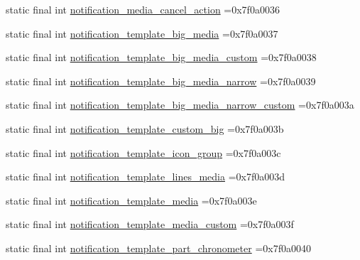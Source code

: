 \begin{DoxyCompactItemize}
static final int \mbox{\hyperlink{classcom_1_1example_1_1trainawearapplication_1_1_r_1_1layout_a07fd51d46bb2925c0b18e29171167ad3}{notification\+\_\+media\+\_\+cancel\+\_\+action}} =0x7f0a0036
\item 
static final int \mbox{\hyperlink{classcom_1_1example_1_1trainawearapplication_1_1_r_1_1layout_a52a08ef57d8c2095df10d45d4f8092e3}{notification\+\_\+template\+\_\+big\+\_\+media}} =0x7f0a0037
\item 
static final int \mbox{\hyperlink{classcom_1_1example_1_1trainawearapplication_1_1_r_1_1layout_a4ee801fe05669fdc4c228750079f0e53}{notification\+\_\+template\+\_\+big\+\_\+media\+\_\+custom}} =0x7f0a0038
\item 
static final int \mbox{\hyperlink{classcom_1_1example_1_1trainawearapplication_1_1_r_1_1layout_a88be24ae4da9b4f0ba63d8b37dfbd1a2}{notification\+\_\+template\+\_\+big\+\_\+media\+\_\+narrow}} =0x7f0a0039
\item 
static final int \mbox{\hyperlink{classcom_1_1example_1_1trainawearapplication_1_1_r_1_1layout_a30a01f806285b12e148fa5fb75e554c5}{notification\+\_\+template\+\_\+big\+\_\+media\+\_\+narrow\+\_\+custom}} =0x7f0a003a
\item 
static final int \mbox{\hyperlink{classcom_1_1example_1_1trainawearapplication_1_1_r_1_1layout_a791878258ff6db63aa65f490eef422af}{notification\+\_\+template\+\_\+custom\+\_\+big}} =0x7f0a003b
\item 
static final int \mbox{\hyperlink{classcom_1_1example_1_1trainawearapplication_1_1_r_1_1layout_af0a9bca6df4ad24ca2f4659dfe673b2d}{notification\+\_\+template\+\_\+icon\+\_\+group}} =0x7f0a003c
\item 
static final int \mbox{\hyperlink{classcom_1_1example_1_1trainawearapplication_1_1_r_1_1layout_aa9abc2dbf880e69366c0b50b1d0d646f}{notification\+\_\+template\+\_\+lines\+\_\+media}} =0x7f0a003d
\item 
static final int \mbox{\hyperlink{classcom_1_1example_1_1trainawearapplication_1_1_r_1_1layout_a2e7bf6d8dd7e59c0ca27f2eb433aa5e5}{notification\+\_\+template\+\_\+media}} =0x7f0a003e
\item 
static final int \mbox{\hyperlink{classcom_1_1example_1_1trainawearapplication_1_1_r_1_1layout_ac7d95444f31ea55a5b8274fbdf246308}{notification\+\_\+template\+\_\+media\+\_\+custom}} =0x7f0a003f
\item 
static final int \mbox{\hyperlink{classcom_1_1example_1_1trainawearapplication_1_1_r_1_1layout_ac8b8fced1207e293669d567dbc50b7a5}{notification\+\_\+template\+\_\+part\+\_\+chronometer}} =0x7f0a0040

\end{DoxyCompactItemize}
